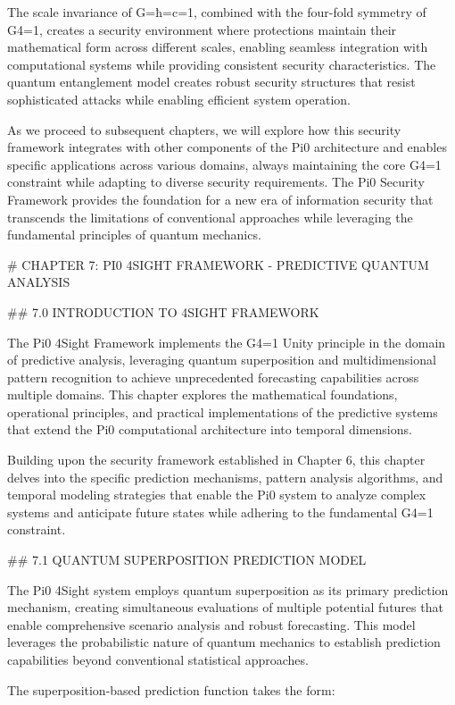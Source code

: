 The scale invariance of G=ħ=c=1, combined with the four-fold symmetry of G4=1, creates a security environment where protections maintain their mathematical form across different scales, enabling seamless integration with computational systems while providing consistent security characteristics. The quantum entanglement model creates robust security structures that resist sophisticated attacks while enabling efficient system operation.

As we proceed to subsequent chapters, we will explore how this security framework integrates with other components of the Pi0 architecture and enables specific applications across various domains, always maintaining the core G4=1 constraint while adapting to diverse security requirements. The Pi0 Security Framework provides the foundation for a new era of information security that transcends the limitations of conventional approaches while leveraging the fundamental principles of quantum mechanics.

# CHAPTER 7: PI0 4SIGHT FRAMEWORK - PREDICTIVE QUANTUM ANALYSIS

## 7.0 INTRODUCTION TO 4SIGHT FRAMEWORK

The Pi0 4Sight Framework implements the G4=1 Unity principle in the domain of predictive analysis, leveraging quantum superposition and multidimensional pattern recognition to achieve unprecedented forecasting capabilities across multiple domains. This chapter explores the mathematical foundations, operational principles, and practical implementations of the predictive systems that extend the Pi0 computational architecture into temporal dimensions.

Building upon the security framework established in Chapter 6, this chapter delves into the specific prediction mechanisms, pattern analysis algorithms, and temporal modeling strategies that enable the Pi0 system to analyze complex systems and anticipate future states while adhering to the fundamental G4=1 constraint.

## 7.1 QUANTUM SUPERPOSITION PREDICTION MODEL

The Pi0 4Sight system employs quantum superposition as its primary prediction mechanism, creating simultaneous evaluations of multiple potential futures that enable comprehensive scenario analysis and robust forecasting. This model leverages the probabilistic nature of quantum mechanics to establish prediction capabilities beyond conventional statistical approaches.

The superposition-based prediction function takes the form:

